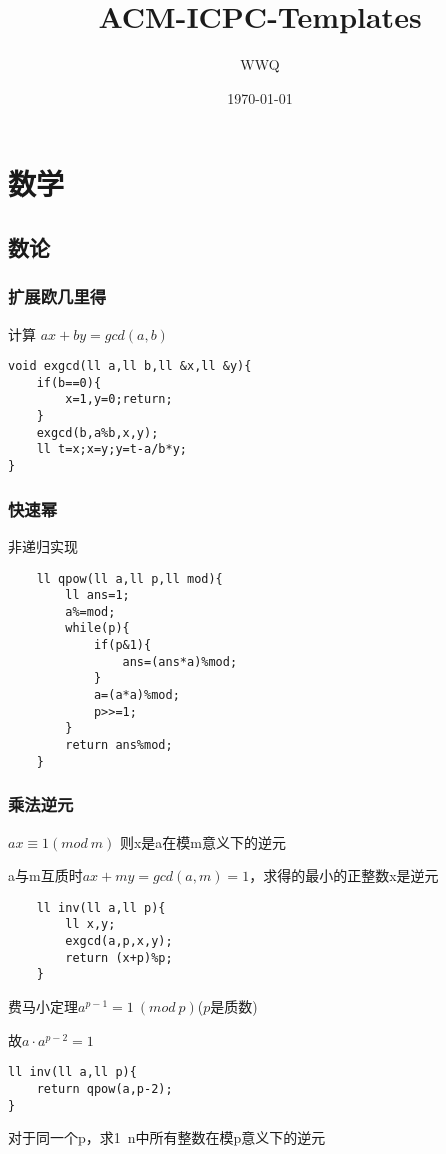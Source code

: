 \documentclass[UTF8]{ctexart}
\title{ACM-ICPC-Templates}
\author{WWQ}
\date{\today}
\begin{document}
\begin{titlepage}
\maketitle
\thispagestyle{empty}
\end{titlepage}

\tableofcontents
\thispagestyle{empty}
\newpage

\setcounter{page}{1}
\section{数学}
\subsection{数论}
\subsubsection{扩展欧几里得}
计算 $ax+by=gcd(a,b)$
\begin{lstlisting}
void exgcd(ll a,ll b,ll &x,ll &y){
	if(b==0){
	    x=1,y=0;return;
	}
	exgcd(b,a%b,x,y);
	ll t=x;x=y;y=t-a/b*y;
}
\end{lstlisting}
\subsubsection{快速幂}
非递归实现
\begin{lstlisting}
    ll qpow(ll a,ll p,ll mod){
        ll ans=1;
        a%=mod;
        while(p){
            if(p&1){
                ans=(ans*a)%mod;
            }
            a=(a*a)%mod;
            p>>=1;
        }
        return ans%mod;
    }
\end{lstlisting}
\subsubsection{乘法逆元}
$ax\equiv1(mod\ m)$ 则x是a在模m意义下的逆元

a与m互质时$ax+my=gcd(a,m)=1$，求得的最小的正整数x是逆元
\begin{lstlisting}
    ll inv(ll a,ll p){
        ll x,y;
        exgcd(a,p,x,y);
        return (x+p)%p;
    } 
\end{lstlisting}

费马小定理$a^{p-1}=1\ (mod\ p)$($p$是质数)

故$a\cdot a^{p-2}=1$
\begin{lstlisting}
ll inv(ll a,ll p){
    return qpow(a,p-2);
}
\end{lstlisting}
对于同一个p，求1~n中所有整数在模p意义下的逆元
\end{document}
